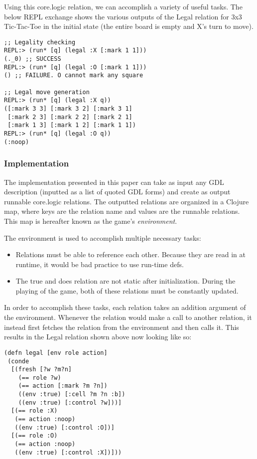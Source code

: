 \documentclass[letterpaper]{article}
\begin{document}
Using this core.logic relation, we can accomplish a variety of useful tasks. The below REPL exchange shows the various outputs of the Legal relation for 3x3 Tic-Tac-Toe in the initial state (the entire board is empty and X's turn to move).

\begin{lstlisting}[frame=single,caption=REPL exchange with the core.logic Legal relation for 3x3 Tic-Tac-Toe in the initial state]
;; Legality checking
REPL:> (run* [q] (legal :X [:mark 1 1]))
(._0) ;; SUCCESS
REPL:> (run* [q] (legal :O [:mark 1 1]))
() ;; FAILURE. O cannot mark any square

;; Legal move generation
REPL:> (run* [q] (legal :X q))
([:mark 3 3] [:mark 3 2] [:mark 3 1]
 [:mark 2 3] [:mark 2 2] [:mark 2 1]
 [:mark 1 3] [:mark 1 2] [:mark 1 1])
REPL:> (run* [q] (legal :O q))
(:noop)
\end{lstlisting}
\subsubsection{Implementation}

The implementation presented in this paper can take as input any GDL description (inputted as a list of quoted GDL forms) and create as output runnable core.logic relations. The outputted relations are organized in a Clojure map, where keys are the relation name and values are the runnable relations. This map is hereafter known as the game's \emph{environment}.

The environment is used to accomplish multiple necessary tasks:

\begin{itemize}
\item Relations must be able to reference each other. Because they are read in at runtime, it would be bad practice to use run-time defs.
\item The true and does relation are not static after initialization. During the playing of the game, both of these relations must be constantly updated.
\end{itemize}

 In order to accomplish these tasks, each relation takes an addition argument of the environment. Whenever the relation would make a call to another relation, it instead first fetches the relation from the environment and then calls it. This results in the Legal relation shown above now looking like so:

\begin{lstlisting}[frame=single, caption=The Legal relation translated into core.logic]
(defn legal [env role action]
 (conde
  [(fresh [?w ?m?n]
    (== role ?w)
    (== action [:mark ?m ?n])
    ((env :true) [:cell ?m ?n :b])
    ((env :true) [:control ?w]))]
  [(== role :X)
   (== action :noop)
   ((env :true) [:control :O])]
  [(== role :O)
   (== action :noop)
   ((env :true) [:control :X])]))
\end{lstlisting}
\end{document}
